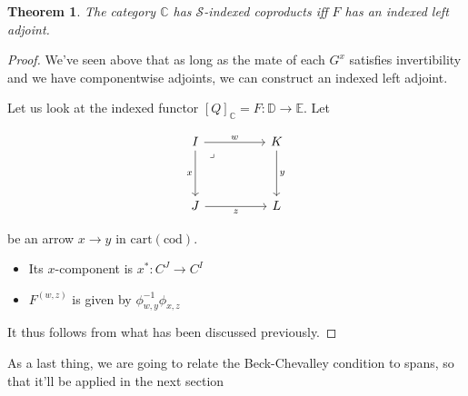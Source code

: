 \documentclass[10pt, oneside]{article}
\newtheorem{theorem}{Theorem}[section]
\begin{document}
\begin{theorem}
    The category $\mathbb{C}$ has $\mathcal{S}$-indexed coproducts iff $F$ has an indexed left adjoint.
\end{theorem}
\begin{proof}
    We've seen above that as long as the mate of each $G^x$ satisfies invertibility and we have componentwise adjoints, we can construct an indexed left adjoint.

    Let us look at the indexed functor $[Q]_\mathbb{C} = F: \mathbb{D} \to \mathbb{E}$. Let

    \[\begin{tikzcd}[ampersand replacement=\&]
	I \&\& K \\
	\\
	J \&\& L
	\arrow["w", from=1-1, to=1-3]
	\arrow["x"', from=1-1, to=3-1]
	\arrow["z"', from=3-1, to=3-3]
	\arrow["y", from=1-3, to=3-3]
	\arrow["\lrcorner"{anchor=center, pos=0.125}, draw=none, from=1-1, to=3-3]
    \end{tikzcd}\]
    
    \noindent be an arrow $x \to y$ in $\mathrm{cart}{(\mathrm{cod})}$.

    
    \begin{itemize}
    
        \item Its $x$-component is $x^\ast: C^J \to C^I$

        \item $F^(w, z)$ is given by $\phi_{w, y}^{-1} \phi_{x, z}$
    \end{itemize}

    It thus follows from what has been discussed previously.
\end{proof}

As a last thing, we are going to relate the Beck-Chevalley condition to spans, so that it'll be applied in the next section
\end{document}
